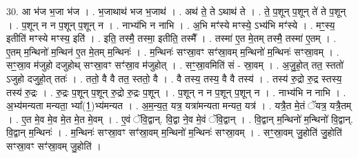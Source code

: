 \documentclass[17pt]{extarticle}
\begin{document}
30. आ भ॑ज भ॒जा भ॑ज । . भ॒जाथाथ॑ भज भ॒जाथ॑ । . अथ॑ ते॒ ते ऽथाथ॑ ते । . ते॒ प॒शून् प॒शून् ते॑ ते प॒शून् । . प॒शून् न न प॒शून् प॒शून् न । . नाभ्य॑भि न नाभि । . अ॒भि मꣳ॑स्ये मꣳस्ये॒ ऽभ्य॑भि मꣳ॑स्ये । . मꣳ॒॒स्य॒ इतीति॑ मꣳस्ये मꣳस्य॒ इति॑ । . इति॒ तस्मै॒ तस्मा॒ इतीति॒ तस्मै᳚ । . तस्मा॑ ए॒त मे॒तम् तस्मै॒ तस्मा॑ ए॒तम् । . ए॒तम् म॒न्थिनो॑ म॒न्थिन॑ ए॒त मे॒तम् म॒न्थिनः॑ । . म॒न्थिनः॑ सꣳस्रा॒वꣳ सꣳ॑स्रा॒वम् म॒न्थिनो॑ म॒न्थिनः॑ सꣳस्रा॒वम् । . सꣳ॒॒स्रा॒व म॑जुहो दजुहोथ् सꣳस्रा॒वꣳ सꣳ॑स्रा॒व म॑जुहोत् । . सꣳ॒॒स्रा॒वमिति॑ सं - स्रा॒वम् । . अ॒जु॒हो॒त् तत॒ स्ततो॑ ऽजुहो दजुहो॒त् ततः॑ । . ततो॒ वै वै तत॒ स्ततो॒ वै । . वै तस्य॒ तस्य॒ वै वै तस्य॑ । . तस्य॑ रु॒द्रो रु॒द्र स्तस्य॒ तस्य॑ रु॒द्रः । . रु॒द्रः प॒शून् प॒शून् रु॒द्रो रु॒द्रः प॒शून् । . प॒शून् न न प॒शून् प॒शून् न । . नाभ्य॑भि न नाभि । . अ॒भ्य॑मन्यता मन्यता॒ भ्या᳚(1॒)भ्य॑मन्यत । . अ॒म॒न्य॒त॒ यत्र॒ यत्रा॑मन्यता मन्यत॒ यत्र॑ । . यत्रै॒त मे॒तं ॅयत्र॒ यत्रै॒तम् । . ए॒त मे॒व मे॒व मे॒त मे॒त मे॒वम् । . ए॒वं ॅवि॒द्वान्. वि॒द्वा ने॒व मे॒वं ॅवि॒द्वान् । . वि॒द्वान् म॒न्थिनो॑ म॒न्थिनो॑ वि॒द्वान्. वि॒द्वान् म॒न्थिनः॑ । . म॒न्थिनः॑ सꣳस्रा॒वꣳ सꣳ॑स्रा॒वम् म॒न्थिनो॑ म॒न्थिनः॑ सꣳस्रा॒वम् । . सꣳ॒॒स्रा॒वम् जु॒होति॑ जु॒होति॑ सꣳस्रा॒वꣳ सꣳ॑स्रा॒वम् जु॒होति॑ । \newline
\end{document}
